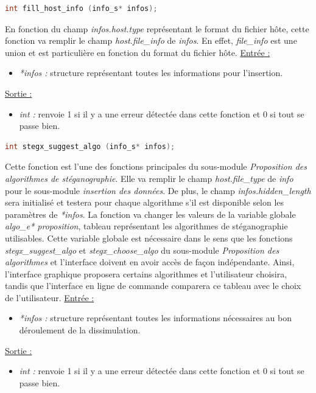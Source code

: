 \documentclass[11pt]{article}
\begin{document}
\begin{lstlisting}[language=c]
int fill_host_info (info_s* infos);
\end{lstlisting}

En fonction du champ \textit{infos.host.type} représentant le format du 
fichier hôte, cette fonction va remplir le champ \textit{host.file\_info} 
de \textit{infos}. En effet, \textit{file\_info} est une union et est 
particulière en fonction du format du fichier hôte. 
\newline
\underline{Entrée :} 
\begin{itemize}
\item \textit{*infos :} structure représentant toutes les informations pour 
l'insertion. 
\end{itemize}
\underline{Sortie :} 
\begin{itemize}
\item \textit{int :} renvoie 1 si il y a une erreur détectée dans cette 
fonction et 0 si tout se passe bien. 
\newline 
\end{itemize}


\begin{lstlisting}[language=c]
int stegx_suggest_algo (info_s* infos);
\end{lstlisting}

Cette fonction est l'une des fonctions principales du sous-module 
\textit{Proposition des algorithmes de stéganographie}. 
Elle va remplir le champ \textit{host.file\_type} 
de \textit{info} pour le sous-module \textit{insertion des données}. 
De plus, le champ \textit{infos.hidden\_length} sera initialisé et testera 
pour chaque algorithme s'il est disponible selon les paramètres de \textit{*infos}. 
La fonction va changer les valeurs de la variable globale \textit{algo\_e* proposition}, 
tableau représentant les algorithmes de stéganographie utilisables. 
Cette variable globale est nécessaire dans le sens que les fonctions 
\textit{stegx\_suggest\_algo} et \textit{stegx\_choose\_algo} du sous-module 
\textit{Proposition des algorithmes} et l'interface doivent en avoir accès de 
façon indépendante. 
Ainsi, l'interface graphique proposera certains algorithmes et l'utilisateur 
choisira, tandis que l'interface en ligne de commande comparera ce tableau 
avec le choix de l'utilisateur. 
\newline
\underline{Entrée :}
\begin{itemize}
\item \textit{*infos :} structure représentant toutes les informations 
nécessaires au bon déroulement de la dissimulation. 
\end{itemize}
\underline{Sortie :} 
\begin{itemize}
\item \textit{int :} renvoie 1 si il y a une erreur détectée dans cette 
fonction et 0 si tout se passe bien. 
\newline 
\end{itemize}
\end{document}
